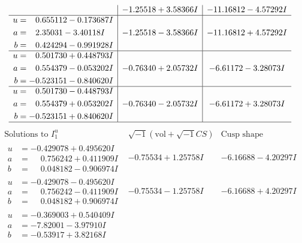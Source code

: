 \documentclass[1p]{elsarticle_modified}
\theoremstyle{definition}
\newcommand{\I}{\sqrt{-1}}
\begin{document}
$$\begin{array}{c|c|c}
 & -1.25518 + 3.58366 I & -11.16812 - 4.57292 I \\ \hline\begin{aligned}
u &= \phantom{-}0.655112 - 0.173687 I \\
a &= \phantom{-}2.35031 - 3.40118 I \\
b &= \phantom{-}0.424294 - 0.991928 I\end{aligned}
 & -1.25518 - 3.58366 I & -11.16812 + 4.57292 I \\ \hline\begin{aligned}
u &= \phantom{-}0.501730 + 0.448793 I \\
a &= \phantom{-}0.554379 - 0.053202 I \\
b &= -0.523151 - 0.840620 I\end{aligned}
 & -0.76340 + 2.05732 I & -6.61172 - 3.28073 I \\ \hline\begin{aligned}
u &= \phantom{-}0.501730 - 0.448793 I \\
a &= \phantom{-}0.554379 + 0.053202 I \\
b &= -0.523151 + 0.840620 I\end{aligned}
 & -0.76340 - 2.05732 I & -6.61172 + 3.28073 I\\
 \hline 
 \end{array}$$\newpage$$\begin{array}{c|c|c}  
\text{Solutions to }I^u_{1}& \I (\text{vol} + \sqrt{-1}CS) & \text{Cusp shape}\\
 \hline 
\begin{aligned}
u &= -0.429078 + 0.495620 I \\
a &= \phantom{-}0.756242 + 0.411909 I \\
b &= \phantom{-}0.048182 - 0.906974 I\end{aligned}
 & -0.75534 + 1.25758 I & -6.16688 - 4.20297 I \\ \hline\begin{aligned}
u &= -0.429078 - 0.495620 I \\
a &= \phantom{-}0.756242 - 0.411909 I \\
b &= \phantom{-}0.048182 + 0.906974 I\end{aligned}
 & -0.75534 - 1.25758 I & -6.16688 + 4.20297 I \\ \hline\begin{aligned}
u &= -0.369003 + 0.540409 I \\
a &= -7.82001 - 3.97910 I \\
b &= -0.53917 + 3.82168 I\end{aligned}

\end{array}$$
\end{document}
